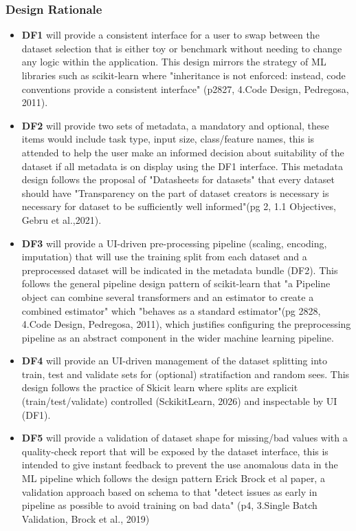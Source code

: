 \documentclass{article}
\begin{document}
\subsubsection{Design Rationale}
\begin{itemize}
\item \textbf{DF1} will provide a consistent interface for a user to swap between the dataset selection that is either toy or benchmark without needing to change any logic within the application. This design mirrors the strategy of ML libraries such as scikit-learn where "inheritance is not enforced: instead, code conventions provide a consistent interface" (p2827, 4.Code Design, Pedregosa, 2011). \\

\item \textbf{DF2} will provide two sets of metadata, a mandatory and optional, these items would include task type, input size, class/feature names, this is attended to help the user make an informed decision about suitability of the dataset if all metadata is on display using the DF1 interface. This metadata design follows the proposal of "Datasheets for datasets" that every dataset should have "Transparency on the part of dataset creators is necessary is necessary for dataset to be sufficiently well informed"(pg 2, 1.1 Objectives, Gebru et al.,2021). \\

\item \textbf{DF3} will provide a UI-driven pre-processing pipeline (scaling, encoding, imputation) that will use the training split from each dataset and a preprocessed dataset will be indicated in the metadata bundle (DF2). This follows the general pipeline design pattern of scikit-learn that "a Pipeline object can combine several transformers and an estimator to create a combined estimator" which "behaves as a standard estimator"(pg 2828, 4.Code Design, Pedregosa, 2011), which justifies configuring the preprocessing pipeline as an abstract component in the wider machine learning pipeline. \\

\item \textbf{DF4} will provide an UI-driven management of the dataset splitting into train, test and validate sets for (optional) stratifaction and random sees. This design follows the practice of Skicit learn where splits are explicit (train/test/validate) controlled (SckikitLearn, 2026) and inspectable by UI (DF1). \\

\item \textbf{DF5} will provide a validation of dataset shape for missing/bad values with a quality-check report that will be exposed by the dataset interface, this is intended to give instant feedback to prevent the use anomalous data in the ML pipeline which follows the design pattern Erick Brock et al paper, a validation approach based on schema to that "detect issues as early in pipeline as possible to avoid training on bad data" (p4, 3.Single Batch Validation, Brock et al., 2019) 
\end{itemize}
\end{document}

